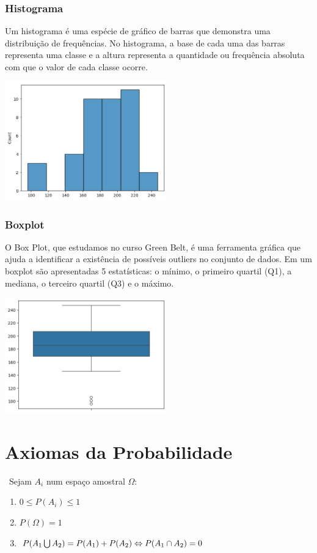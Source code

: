 \documentclass{article}
\begin{document}
\begin{multicols}{2}
    \subsubsection{Histograma}
      Um histograma é uma espécie de gráfico de barras que demonstra uma distribuição de frequências. No histograma, 
    a base de cada uma das barras representa uma classe e a altura representa a quantidade ou frequência absoluta com 
    que o valor de cada classe ocorre.

    \hbox{\includegraphics[width=7cm]{Histograma.png}}
    
    \subsubsection{Boxplot}  
    O Box Plot, que estudamos no curso Green Belt, é uma ferramenta gráfica que ajuda a identificar a existência de 
    possíveis outliers no conjunto de dados. Em um boxplot são apresentadas 5 estatísticas: o mínimo, o primeiro quartil 
    (Q1), a mediana, o terceiro quartil (Q3) e o máximo.
    
    \hbox{\includegraphics[width=7cm]{Boxplot.png}}  
    
\section{Axiomas da Probabilidade}

    \ Sejam $ A_i $ num espaço amostral $ \Omega: $

    \begin{enumerate}
      \item $ 0 \leqslant P(A_i) \leqslant 1 $
      \item $ P(\Omega) = 1 $
      \item $ P(A_1 \bigcup A_2) = P(A_1) + P(A_2)\\ \Leftrightarrow P(A_1 \cap A_2) = 0 $
    \end{enumerate}


\end{multicols}
\end{document}
